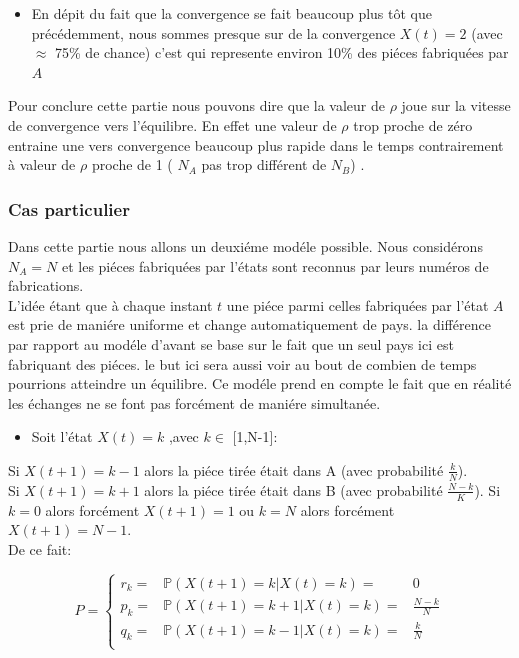 \documentclass[11pt,]{article}
\providecommand{\tightlist}{%
  \setlength{\itemsep}{0pt}\setlength{\parskip}{0pt}}
\begin{document}
\begin{itemize}
\tightlist
\item
  En dépit du fait que la convergence se fait beaucoup plus tôt que
  précédemment, nous sommes presque sur de la convergence \(X(t)=2\)
  (avec \(\approx\) 75\% de chance) c'est qui represente environ 10\%
  des piéces fabriquées par \(A\)
\end{itemize}

Pour conclure cette partie nous pouvons dire que la valeur de \(\rho\)
joue sur la vitesse de convergence vers l'équilibre. En effet une valeur
de \(\rho\) trop proche de zéro entraine une vers convergence beaucoup
plus rapide dans le temps contrairement à valeur de \(\rho\) proche de 1
( \(N_A\) pas trop différent de \(N_B\)) .

\subsubsection{Cas particulier}\label{cas-particulier}

Dans cette partie nous allons un deuxiéme modéle possible. Nous
considérons \(N_A=N\) et les piéces fabriquées par l'états sont reconnus
par leurs numéros de fabrications.\\
L'idée étant que à chaque instant \(t\) une piéce parmi celles
fabriquées par l'état \(A\) est prie de maniére uniforme et change
automatiquement de pays. la différence par rapport au modéle d'avant se
base sur le fait que un seul pays ici est fabriquant des piéces. le but
ici sera aussi voir au bout de combien de temps pourrions atteindre un
équilibre. Ce modéle prend en compte le fait que en réalité les échanges
ne se font pas forcément de maniére simultanée.

\begin{itemize}
\tightlist
\item
  Soit l'état \(X(t)=k\) ,avec \(k \in\) {[}1,N-1{]}:
\end{itemize}

Si \(X(t+1)=k-1\) alors la piéce tirée était dans A (avec probabilité
\(\frac{k}{N}\)).\\
Si \(X(t+1)=k+1\) alors la piéce tirée était dans B (avec probabilité
\(\frac{N-k}{K}\)). Si \(k=0\) alors forcément \(X(t+1)=1\) ou \(k=N\)
alors forcément \(X(t+1)=N-1\).\\
De ce fait:

\[   
P=\left \{
  \begin{array}{rcr}
  r_k=&\mathbb{P}(X(t+1)=k|X(t)=k)=&0\\
  p_k=&\mathbb{P}(X(t+1)=k+1|X(t)=k)=&\frac{N-k}{N}\\
  q_k=& \mathbb{P}(X(t+1)=k-1|X(t)=k)=& \frac{k}{N}\\
\end{array}
\right.
\]
\end{document}
